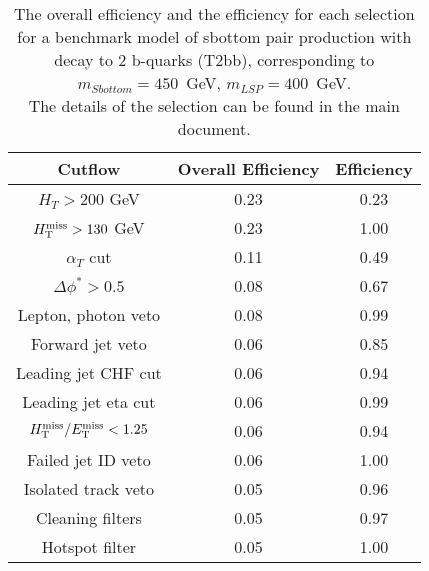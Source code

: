 \begin{longtable}{| c | c | c  | }
\caption{The overall efficiency and the efficiency for each selection for a benchmark model 
  of sbottom pair production with decay to 2 b-quarks
  (T2bb), corresponding to $m_{Sbottom} = 450 $~GeV, $m_{LSP} = 400$~GeV. \\
  The details of the selection can be found in the main document. \label{tab:T2bb_450_400}} \\    \hline 
\textbf{Cutflow} & \textbf{Overall Efficiency} & \textbf{Efficiency}\\ \hline 
$H_{T} > 200$ GeV & 0.23 & 0.23\\ \hline 
$H_{\rm T}^{\rm miss} > 130$ GeV & 0.23 & 1.00\\ \hline 
$\alpha_{T}$ cut & 0.11 & 0.49\\ \hline 
$\Delta\phi^{*} > 0.5$ & 0.08 & 0.67\\ \hline 
Lepton, photon veto & 0.08 & 0.99\\ \hline 
Forward jet veto & 0.06 & 0.85\\ \hline 
Leading jet CHF cut & 0.06 & 0.94\\ \hline 
Leading jet eta cut & 0.06 & 0.99\\ \hline 
$H_{\rm T}^{\rm miss} / E_{\rm T}^{\rm miss} < 1.25$ & 0.06 & 0.94\\ \hline 
Failed jet ID veto & 0.06 & 1.00\\ \hline 
Isolated track veto & 0.05 & 0.96\\ \hline 
Cleaning filters & 0.05 & 0.97\\ \hline 
Hotspot filter & 0.05 & 1.00\\ \hline 
    \hline 
    \hline 
\end{longtable}
